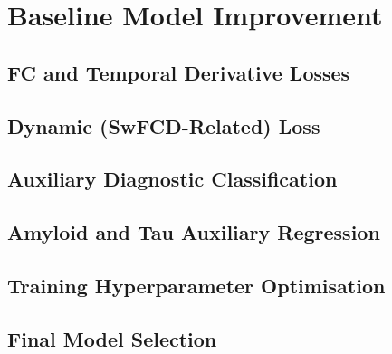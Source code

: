 \section{Baseline Model Improvement}
\subsection{FC and Temporal Derivative Losses}
\subsection{Dynamic (SwFCD-Related) Loss}
\subsection{Auxiliary Diagnostic Classification}
\subsection{Amyloid and Tau Auxiliary Regression}
\subsection{Training Hyperparameter Optimisation}
\subsection{Final Model Selection}

